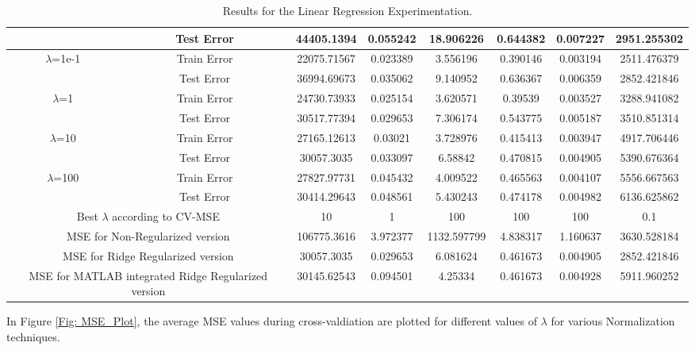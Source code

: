 \documentclass[11pt]{article}
\begin{document}
\begin{table}[H]
\begin{adjustbox}{width=0.75\paperwidth}
\begin{tabular}{| c | c |cccccc|}
			& Test Error & 44405.1394 & 0.055242 & 18.906226 & 0.644382 & 0.007227 & 2951.255302 \\ \hline
			\multirow{2}{*}{$\lambda$=1e-1} & Train Error & 22075.71567 & 0.023389 & 3.556196 & 0.390146 & 0.003194 & 2511.476379 \\ 
			& Test Error & 36994.69673 & 0.035062 & 9.140952 & 0.636367 & 0.006359 & 2852.421846 \\ \hline
			\multirow{2}{*}{$\lambda$=1} & Train Error & 24730.73933 & 0.025154 & 3.620571 & 0.39539 & 0.003527 & 3288.941082 \\ 
			& Test Error & 30517.77394 & 0.029653 & 7.306174 & 0.543775 & 0.005187 & 3510.851314 \\ \hline
			\multirow{2}{*}{$\lambda$=10} & Train Error & 27165.12613 & 0.03021 & 3.728976 & 0.415413 & 0.003947 & 4917.706446 \\ 
			& Test Error & 30057.3035 & 0.033097 & 6.58842 & 0.470815 & 0.004905 & 5390.676364 \\ \hline
			\multirow{2}{*}{$\lambda$=100} & Train Error & 27827.97731 & 0.045432 &	4.009522 &	0.465563 &	0.004107 &	5556.667563 \\ 
			& Test Error & 30414.29643 & 0.048561 &	5.430243 & 0.474178 & 0.004982 & 6136.625862 \\ \hline
			\multicolumn{2}{|c|}{Best $\lambda$ according to CV-MSE} & 10 & 1 & 100 & 100 & 100 & 0.1 \\ \hline
			\multicolumn{2}{|c|}{MSE for Non-Regularized version} & 106775.3616 & 3.972377 & 1132.597799 & 4.838317 & 1.160637 & 3630.528184 \\ \hline
			\multicolumn{2}{|c|}{MSE for Ridge Regularized version}  & 30057.3035 & 0.029653 & 6.081624 & 0.461673 & 0.004905 & 2852.421846 \\ \hline
			\multicolumn{2}{|c|}{MSE for MATLAB integrated Ridge Regularized version}  & 30145.62543 & 0.094501 & 4.25334 & 0.461673 & 0.004928 & 5911.960252 \\ \hline
		\end{tabular}
	\end{adjustbox}
	
	\caption{Results for the Linear Regression Experimentation.}
\end{table}

In Figure \ref{Fig: MSE_Plot}, the average MSE values during cross-valdiation are plotted for different values of $\lambda$ for various Normalization techniques. 
\end{document}
